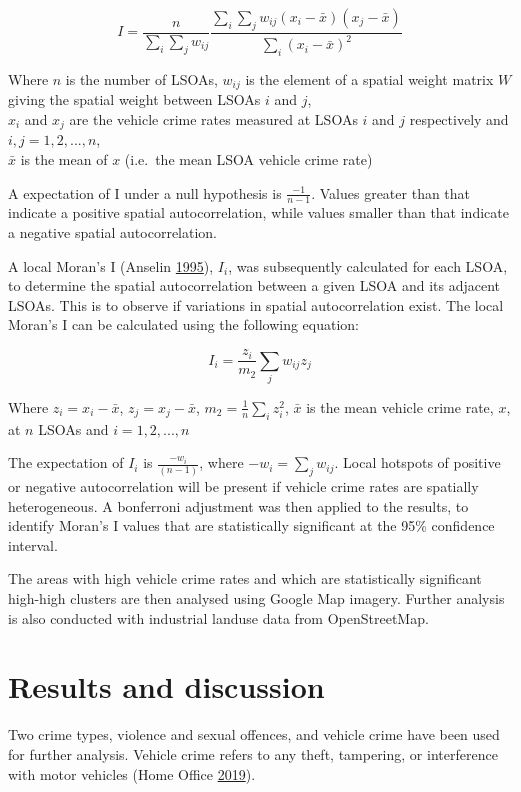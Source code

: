 \documentclass[]{article}
\theoremstyle{definition}
\theoremstyle{definition}
\theoremstyle{definition}
\theoremstyle{remark}
\begin{document}
\[I=\frac{n} {\sum_{i}\sum_{j}w_{ij}} \frac{\sum_{i}\sum_{j}w_{ij}(x_i-\bar{x})(x_j-\bar{x})} {\sum_{i}(x_i-\bar{x})^2}\]

Where \(n\) is the number of LSOAs, \(w_{ij}\) is the element of a
spatial weight matrix \(W\) giving the spatial weight between LSOAs
\(i\) and \(j\),\\
\(x_i\) and \(x_j\) are the vehicle crime rates measured at LSOAs \(i\)
and \(j\) respectively and \(i,j=1,2,...,n\),\\
\(\bar{x}\) is the mean of \(x\) (i.e.~the mean LSOA vehicle crime rate)

A expectation of I under a null hypothesis is \(\frac{-1} {n-1}\).
Values greater than that indicate a positive spatial autocorrelation,
while values smaller than that indicate a negative spatial
autocorrelation.

A local Moran's I (Anselin \protect\hyperlink{ref-Anselin1995}{1995}),
\(I_i\), was subsequently calculated for each LSOA, to determine the
spatial autocorrelation between a given LSOA and its adjacent LSOAs.
This is to observe if variations in spatial autocorrelation exist. The
local Moran's I can be calculated using the following equation:

\[I_i=\frac{z_i}{m_2}\sum_{j}w_{ij}z_j\]

Where \(z_i = x_i-\bar{x}\), \(z_j = x_j-\bar{x}\),
\(m_2=\frac{1}{n}\sum_{i}z_i^2\), \(\bar{x}\) is the mean vehicle crime
rate, \(x\), at \(n\) LSOAs and \(i=1,2,...,n\)

The expectation of \(I_i\) is \(\frac{-w_i}{(n-1)}\), where
\(-w_i=\sum_{j}w_{ij}\). Local hotspots of positive or negative
autocorrelation will be present if vehicle crime rates are spatially
heterogeneous. A bonferroni adjustment was then applied to the results,
to identify Moran's I values that are statistically significant at the
95\% confidence interval.

The areas with high vehicle crime rates and which are statistically
significant high-high clusters are then analysed using Google Map
imagery. Further analysis is also conducted with industrial landuse data
from OpenStreetMap. \pagebreak

\section{Results and discussion}\label{results-and-discussion}

Two crime types, violence and sexual offences, and vehicle crime have
been used for further analysis. Vehicle crime refers to any theft,
tampering, or interference with motor vehicles (Home Office
\protect\hyperlink{ref-Office2019}{2019}).
\end{document}
